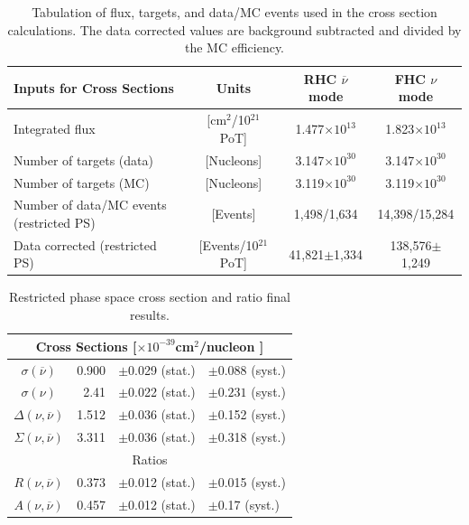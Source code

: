 \begin{table}
\caption{\label{tab:input to final cross sections}
Tabulation of flux, targets,
and data/MC events used in the cross section calculations.
The data corrected values are background
subtracted and divided by the MC efficiency.
}
\begin{tabular}{lccc}
\hline
\hline
Inputs for Cross Sections & Units & RHC $\overline{\nu}$ mode & FHC $\nu$ mode \tabularnewline
\midrule 
Integrated flux  & {[}cm$^{2}$/10$^{21}$ PoT{]}  & 1.477$\times10^{13}$  & 1.823$\times10^{13}$\tabularnewline
Number of targets (data)  & {[}Nucleons{]}  & 3.147$\times10^{30}$  & 3.147$\times10^{30}$ \tabularnewline
Number of targets (MC)  & {[}Nucleons{]}  & 3.119$\times10^{30}$  & 3.119$\times10^{30}$ \tabularnewline
\midrule 
Number of data/MC events (restricted PS) & {[}Events{]} & 1,498/1,634 & 14,398/15,284
 \tabularnewline
Data corrected (restricted PS) & {[}Events/10$^{21}$ PoT{]}   & 41,821$\pm$1,334 & 138,576$\pm$1,249
\tabularnewline
\hline
\hline
\end{tabular}
\end{table}


\begin{table}
\caption{\label{tab:Restricted-phase-space-cross_sections} Restricted phase
space cross section and ratio final results.}

\begin{tabular}{crcl}
\hline
\hline 
\multicolumn{4}{c}{Cross Sections {[}$\times10^{-39}$cm$^{2}$/nucleon
{]} }\tabularnewline
\hline 
$\sigma\left(\overline{\nu}\right)$  & 0.900  & $\pm$0.029 (stat.)  & $\pm0.088$ (syst.) \tabularnewline
$\sigma\left(\nu\right)$ & 2.41  & $\pm$0.022 (stat.)  & $\pm0.231$ (syst.) \tabularnewline

$\Delta(\nu,\overline\nu)$   & 1.512  & $\pm$0.036 (stat.)  & $\pm$0.152 (syst.) \tabularnewline
$\Sigma(\nu,\overline\nu)$    & 3.311  & $\pm$0.036 (stat.)  & $\pm$0.318 (syst.) \tabularnewline
\hline 
\multicolumn{4}{c}{Ratios}\tabularnewline
\hline 
$R(\nu,\overline\nu)$  & 0.373  & $\pm$0.012 (stat.)  & $\pm$0.015 (syst.) \tabularnewline
$A(\nu,\overline\nu)$  & 0.457  & $\pm$0.012 (stat.)  & $\pm$0.17 (syst.) 
\tabularnewline
\hline
\hline 
\end{tabular}
\end{table}

